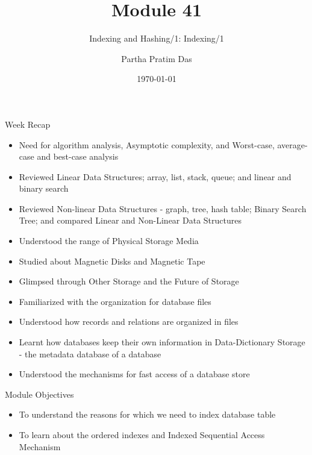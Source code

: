 \documentclass[aspectratio=169, xcolor=dvipsnames]{beamer}
\title{Module 41}
\subtitle{Indexing and Hashing/1: Indexing/1}
\author{Partha Pratim Das}
\institute{Department of Computer Science and Engineering\\Indian Institute of Technology, Kharagpur\\ppd@cse.iitkgp.ac.in}
\date{\today}
\begin{document}
\begin{frame}
    \titlepage
\end{frame}

\begin{frame}{Week Recap}
    \begin{block}{}
        \begin{itemize}[<+->]
            \item Need for algorithm analysis, Asymptotic complexity, and Worst-case, average-case and best-case analysis
            \item Reviewed Linear Data Structures; array, list, stack, queue; and linear and binary search
            \item Reviewed Non-linear Data Structures - graph, tree, hash table; Binary Search Tree; and compared Linear and Non-Linear Data Structures
            \item Understood the range of Physical Storage Media
            \item Studied about Magnetic Disks and Magnetic Tape
            \item Glimpsed through Other Storage and the Future of Storage
            \item Familiarized with the organization for database files
            \item Understood how records and relations are organized in files
            \item Learnt how databases keep their own information in Data-Dictionary Storage - the metadata database of a database
            \item Understood the mechanisms for fast access of a database store
        \end{itemize}
    \end{block}
\end{frame}

\begin{frame}{Module Objectives}
    \begin{block}{}
        \begin{itemize}[<+->]
            \item To understand the reasons for which we need to index database table
            \item To learn about the ordered indexes and Indexed Sequential Access Mechanism
        \end{itemize}
    \end{block}
\end{frame}
\end{document}
